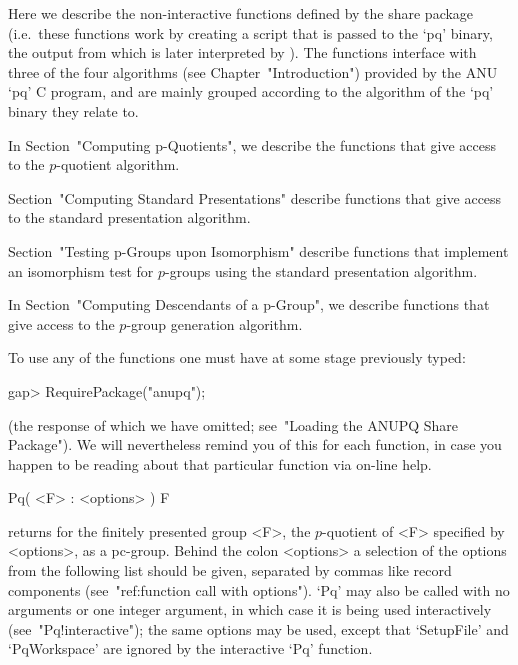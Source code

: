 

Here we describe the non-interactive functions defined  by  the  {\ANUPQ}
share package (i.e.~these functions work by creating  a  script  that  is
passed to the `pq' binary, the output from which is later interpreted  by
{\GAP}). The functions interface with three of the four  algorithms  (see
Chapter~"Introduction") provided by the  ANU  `pq'  C  program,  and  are
mainly grouped according to the algorithm of the `pq' binary they  relate
to.

In Section~"Computing p-Quotients", we describe the functions  that  give
access to the $p$-quotient algorithm.

Section~"Computing Standard Presentations" describe functions  that  give
access to the standard presentation algorithm.

Section~"Testing  p-Groups  upon  Isomorphism"  describe  functions  that
implement  an  isomorphism  test  for  $p$-groups  using   the   standard
presentation algorithm.

In Section~"Computing Descendants of a p-Group",  we  describe  functions
that give access to the $p$-group generation algorithm.

To use any of the functions one must have at some stage previously typed:

\beginexample
gap> RequirePackage("anupq");
\endexample

(the response of which we have  omitted;  see~"Loading  the  ANUPQ  Share
Package"). We will nevertheless remind you of this for each function,  in
case you happen to be reading about that particular function via  on-line
help.


\>Pq( <F> : <options> ) F

returns for the finitely presented group <F>,  the  $p$-quotient  of  <F>
specified by <options>, as a  pc-group.  Behind  the  colon  <options>  a
selection of the  options  from  the  following  list  should  be  given,
separated by commas like record components (see~"ref:function  call  with
options"). `Pq' may also be called  with  no  arguments  or  one  integer
argument,   in   which   case   it   is    being    used    interactively
(see~"Pq!interactive");  the  same  options  may  be  used,  except  that
`SetupFile'  and  `PqWorkspace'  are  ignored  by  the  interactive  `Pq'
function.

